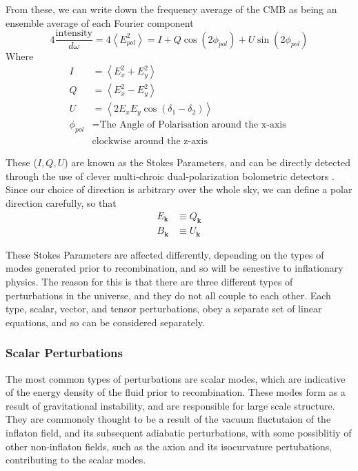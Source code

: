 From these, we can write down the frequency average of the CMB as being an ensemble average of each Fourier component
$$ 4 \frac{\text{intensity}}{d \omega} = 4 \left< E_{pol}^2 \right> =  I + Q \cos(2 \phi_{pol}) + U \sin(2 \phi_{pol}) $$
Where
\begin{align*}
	I          & = \left< E_x^2 + E_y^2 \right>                        \\
	Q          & = \left< E_x^2 - E_y^2 \right>                        \\
	U          & = \left<2 E_x E_y \cos(\delta_1 - \delta_2) \right>   \\
	\phi_{pol} & = \text{The Angle of Polarisation around the x-axis } \\
	           & \text{clockwise around the z-axis}                    
\end{align*}

These ($I,Q,U$) are known as the Stokes Parameters, and can be directly detected through the use of clever multi-chroic dual-polarization bolometric detectors \cite{1210.8256}. Since our choice of direction is arbitrary over the whole sky, we can define a polar direction carefully, so that
\begin{align*}
	E_\textbf{k} & \equiv Q_\textbf{k} \\
	B_\textbf{k} & \equiv U_\textbf{k} 
\end{align*}


\par These Stokes Parameters are affected differently, depending on the types of modes generated prior to recombination, and so will be senestive to inflationary physics. The reason for this is that there are three different types of perturbations in the universe, and they do not all couple to each other. Each type, scalar, vector, and tensor perturbations, obey a separate set of linear equations, and so can be considered separately.

\subsubsection{Scalar Perturbations}
The most common types of perturbations are scalar modes, which are indicative of the energy density of the fluid prior to recombination. These modes form as a result of gravitational instability, and are responsible for large scale structure. They are commonoly thought to be a result of the vacuum fluctutaion of the inflaton field, and its subsequent adiabatic perturbations, with some possiblitiy of other non-inflaton fields, such as the axion and its isocurvature pertubations, contributing to the scalar modes.

